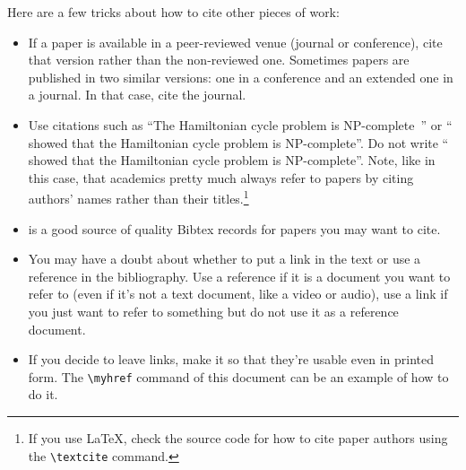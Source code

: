 Here are a few tricks about how to cite other pieces of work:
\begin{itemize}
  \item If a paper is available in a peer-reviewed venue (journal or conference), cite that
  version rather than the non-reviewed one. Sometimes papers are published in two similar
  versions: one in a conference and an extended one in a journal. In that case, cite the
  journal.
  \item Use citations such as ``The Hamiltonian cycle problem is
  NP-complete~\cite{DBLP:conf/coco/Karp72}'' or ``\textcite{DBLP:conf/coco/Karp72} showed
  that the Hamiltonian cycle problem is NP-complete''. Do not write
  ``\cite{DBLP:conf/coco/Karp72} showed that the Hamiltonian cycle problem is NP-complete''. Note, like in this case, that academics pretty much always refer to papers by citing authors' names rather than their titles.\footnote{If you use \LaTeX, check the source code for how to cite paper authors using the \texttt{\textbackslash textcite} command.}
  \item {} is a good source of quality Bibtex records for papers
  you may want to cite.
  \item You may have a doubt about whether to put a link in the text or use a reference in the bibliography. Use a reference if it is a document you want to refer to (even if it's not a text document, like a video or audio), use a link if you just want to refer to something but do not use it as a reference document.
  \item If you decide to leave links, make it so that they're usable even in printed form. The \verb|\myhref| command of this document can be an example of how to do it.
\end{itemize}
